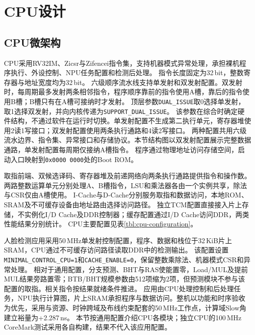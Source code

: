 \section{CPU设计}

\subsection{CPU微架构}

CPU采用RV32IM、Zicsr与Zifencei指令集\cite{riscv-unpriv-20260120}，支持机器模式异常处理，承担裸机程序执行、外设控制、NPU任务配置和检测后处理。
指令长度固定为32\,bit，整数寄存器与地址宽度均为32\,bit。
六级顺序流水线支持单发射和双发射配置。双发射时，每周期最多发射两条相邻指令，程序顺序靠前的指令使用A槽，靠后的指令使用B槽；B槽只有在A槽可接纳时才发射。
顶层参数\texttt{DUAL\_ISSUE}取0选择单发射，取1选择双发射，并向内核传递为\texttt{SUPPORT\_DUAL\_ISSUE}。
该参数在综合时确定硬件结构，不通过软件在运行时切换。单发射配置不生成第二执行单元，寄存器堆使用2读1写接口；双发射配置使用两条执行通路和4读2写接口。
两种配置共用六级流水边界、指令集、异常接口和存储协议。本节结构图以双发射配置展示完整数据通路，单发射配置每周期仅接纳A槽指令。
程序通过物理地址访问存储空间，启动入口映射到\texttt{0x0000\,0000}处的Boot ROM。

取指前端、双候选译码、寄存器堆及前递网络向两条执行通路提供指令和操作数。
两路整数运算单元分别处理A、B槽指令，LSU和乘法器各由一个实例共享，除法与CSR仅由A槽使用。
I-Cache与D-Cache分别服务取指和数据访问，本地ROM、SRAM及不可缓存设备由地址路由选择访问路径。
独立TCM配置直接接入片上存储，不实例化I/D Cache及DDR控制器；缓存配置通过I/D Cache访问DDR，两类性能结果分别统计。
CPU主要配置见表\ref{tbl:cpu-configuration}。

人脸检测应用采用50\,MHz单发射控制配置，程序、数据和栈位于32\,KiB片上SRAM，CPU通过不可缓存访问路径读取DDR中的检测输出。
该配置设置\texttt{MINIMAL\_CONTROL\_CPU=1}和\texttt{CACHE\_ENABLE=0}，保留整数乘除法、机器模式CSR和异常处理。
相对于通用配置，分支预测、BHT与RAS使能置零，Load/MUL及提前MUL结果旁路置零；BTB/BHT规模参数由512项缩为2项，但预测模块不参与该配置的取指。相关指令按结果就绪条件推进。
应用由CPU处理控制和后处理任务，NPU执行计算图，片上SRAM承担程序与数据访问。整机以功能和时序验收为优先，采用与资源、时钟跨域及布线约束配套的50\,MHz工作点，计算域Slow角建立裕量为+2.287\,ns。
本节按通用配置介绍CPU各模块；独立CPU的100\,MHz CoreMark测试采用各自构建，结果不代入该应用配置。

